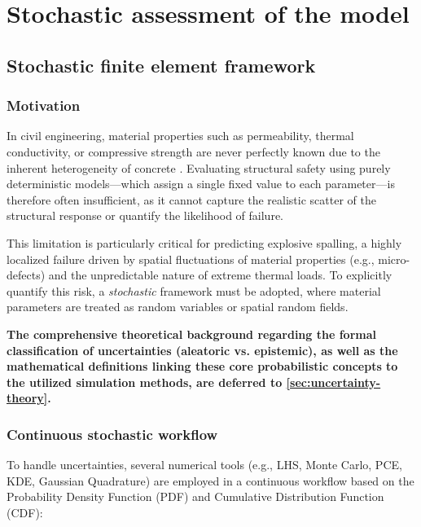 \chapter{Stochastic assessment of the model} \label{chapter5} %

\section{Stochastic finite element framework} \label{sec:stochastic-framework}
\subsection{Motivation}
In civil engineering, material properties such as permeability, thermal conductivity, or compressive strength are never perfectly known due to the inherent heterogeneity of concrete \cite{baroth2011,delarrard2010}. Evaluating structural safety using purely deterministic models---which assign a single fixed value to each parameter---is therefore often insufficient, as it cannot capture the realistic scatter of the structural response or quantify the likelihood of failure.

This limitation is particularly critical for predicting explosive spalling, a highly localized failure driven by spatial fluctuations of material properties (e.g., micro-defects) and the unpredictable nature of extreme thermal loads. To explicitly quantify this risk, a \emph{stochastic} framework must be adopted, where material parameters are treated as random variables or spatial random fields. 

\textbf{The comprehensive theoretical background regarding the formal classification of uncertainties (aleatoric vs. epistemic), as well as the mathematical definitions linking these core probabilistic concepts to the utilized simulation methods, are deferred to \cref{sec:uncertainty-theory}.}

\subsection{Continuous stochastic workflow}
To handle uncertainties, several numerical tools (e.g., LHS, Monte Carlo, PCE, KDE, Gaussian Quadrature) are employed in a continuous workflow based on the Probability Density Function (PDF) and Cumulative Distribution Function (CDF):

